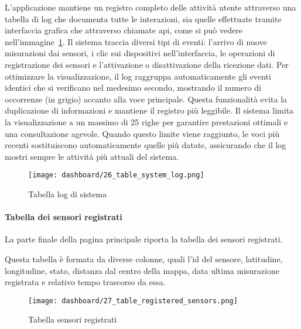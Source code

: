 L'applicazione mantiene un registro completo delle attività utente attraverso una tabella di log che documenta tutte
le interazioni, sia quelle effettuate tramite interfaccia grafica che attraverso chiamate \acrshort{api}, come si
può vedere nell'immagine~\ref{fig:app-tab-system-log}.
Il sistema traccia diversi tipi di eventi: l'arrivo di nuove misurazioni dai sensori, i clic sui dispositivi
nell'interfaccia, le operazioni di registrazione dei sensori e l'attivazione o disattivazione della ricezione dati.
Per ottimizzare la visualizzazione, il log raggruppa automaticamente gli eventi identici che si verificano
nel medesimo secondo, mostrando il numero di occorrenze (in grigio) accanto alla voce principale.
Questa funzionalità evita la duplicazione di informazioni e mantiene il registro più leggibile.
Il sistema limita la visualizzazione a un massimo di 25 righe per garantire prestazioni ottimali e una consultazione
agevole. Quando questo limite viene raggiunto, le voci più recenti sostituiscono automaticamente quelle più datate,
assicurando che il log mostri sempre le attività più attuali del sistema.

\begin{figure}[H]
  \centering
  \texttt{[image: dashboard/26\_table\_system\_log.png]}
  \caption{Tabella log di sistema}
  \label{fig:app-tab-system-log}
\end{figure}

\newpage

\paragraph{Tabella dei sensori registrati}

La parte finale della pagina principale riporta la tabella dei sensori registrati.

Questa tabella è formata da diverse colonne, quali l'id del sensore, latitudine, longitudine, stato,
distanza dal centro della mappa, data ultima misurazione registrata e relativo tempo trascorso da essa.

\begin{figure}[H]
  \centering
  \texttt{[image: dashboard/27\_table\_registered\_sensors.png]}
  \caption{Tabella sensori registrati}
  \label{fig:app-tab-registered-sensors}
\end{figure}


